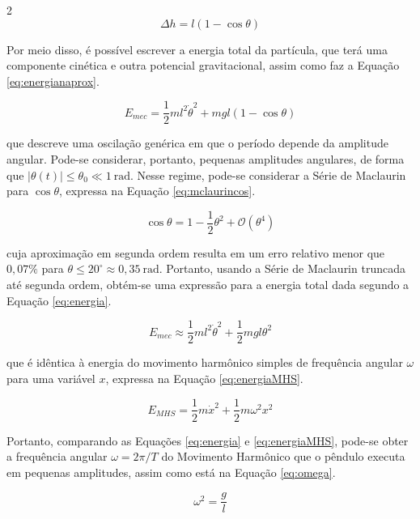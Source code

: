 \documentclass[12pt, a4paper, brazilian]{article}
\begin{document}
\begin{multicols}{2}
	\begin{equation}\label{eq:deltah}
		\Delta h = l(1-\cos\theta)
	\end{equation}

	Por meio disso, é possível escrever a energia total da partícula, que terá uma componente cinética e outra potencial gravitacional, assim como faz a Equação \ref{eq:energianaprox}.

	\begin{equation}\label{eq:energianaprox}
		E_{mec} = \frac{1}{2}ml^2\dot\theta^2 + mgl(1-\cos\theta)
	\end{equation}

	que descreve uma oscilação genérica em que o período depende da amplitude angular. Pode-se considerar, portanto, pequenas amplitudes angulares, de forma que $|\theta(t)|\le\theta_0\ll 1\ \text{rad}$. Nesse regime, pode-se considerar a Série de Maclaurin para $\cos\theta$, expressa na Equação \ref{eq:mclaurincos}.

	\begin{equation}\label{eq:mclaurincos}
		\cos\theta = 1 - \frac{1}{2}\theta^2 + \mathcal{O}(\theta^4)
	\end{equation}

	cuja aproximação em segunda ordem resulta em um erro relativo menor que $0,07\%$ para $\theta\le 20^\circ\approx 0,35\ \text{rad}$. Portanto, usando a Série de Maclaurin truncada até segunda ordem, obtém-se uma expressão para a energia total dada segundo a Equação \ref{eq:energia}.

	\begin{equation}\label{eq:energia}
		E_{mec}\approx \frac{1}{2}ml^2\dot\theta^2+\frac{1}{2}mgl\theta^2
	\end{equation}

	que é idêntica à energia do movimento harmônico simples de frequência angular $\omega$ para uma variável $x$, expressa na Equação \ref{eq:energiaMHS}.

	\begin{equation}\label{eq:energiaMHS}
		E_{MHS} = \frac{1}{2}m\dot x^2 + \frac{1}{2}m\omega^2x^2
	\end{equation}

	Portanto, comparando as Equações \ref{eq:energia} e \ref{eq:energiaMHS}, pode-se obter a frequência angular $\omega = 2\pi/T$ do Movimento Harmônico que o pêndulo executa em pequenas amplitudes, assim como está na Equação \ref{eq:omega}.\cite{springer}

	\begin{equation}\label{eq:omega}
		\omega^2=\frac{g}{l}
	\end{equation}


\end{multicols}
\end{document}
